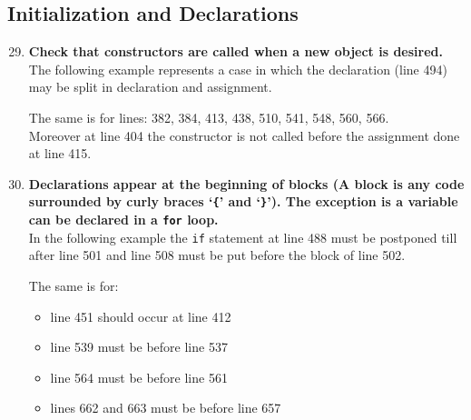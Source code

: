 \documentclass[a4paper,11pt]{report} %
\begin{document}
		\subsection*{Initialization and Declarations}\begin{enumerate}[resume]
			\setcounter{enumi}{28}
			\setcounter{enumi}{29}
			\item \textbf{Check that constructors are called when a new object is desired.}\smallskip \\
				The following example represents a case in which the declaration (line 494) may be split in declaration and assignment.
				
				The same is for lines: 382, 384, 413, 438, 510, 541, 548, 560, 566.\\
				Moreover at line 404 the constructor is not called before the assignment done at line 415.
				
			\pagebreak
			\setcounter{enumi}{32}
			\item \textbf{Declarations appear at the beginning of blocks (A block is any code surrounded by curly braces `\texttt{\{}' and `\texttt{\}}'). The exception is a variable can be declared in a \texttt{for} loop.} \smallskip \\
				In the following example the \texttt{if} statement at line 488 must be postponed till after line 501 and line 508 must be put before the block of line 502.
				
				The same is for:
				\begin{itemize}
					\item line 451 should occur at line 412
					\item line 539 must be before line 537
					\item line 564 must be before line 561
					\item lines 662 and 663 must be before line 657
				\end{itemize}
		\end{enumerate}
		
\end{document}
